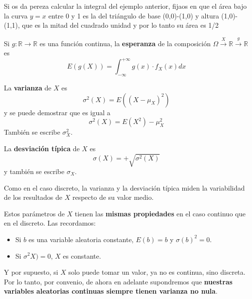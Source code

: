 \documentclass[
  spanish,
  letterpaper,
  DIV=11,
  numbers=noendperiod]{scrreprt}
\begin{document}

Si os da pereza calcular la integral del ejemplo anterior, fijaos en que
el área bajo la curva \(y=x\) entre 0 y 1 es la del triángulo de base
(0,0)-(1,0) y altura (1,0)-(1,1), que es la mitad del cuadrado unidad y
por lo tanto su área es 1/2 

Si \(g:\mathbb{R}\to \mathbb{R}\) es una función continua, la
\textbf{esperanza} de la composición
\(\Omega \stackrel{X}{\longrightarrow} \mathbb{R}\stackrel{g}{\longrightarrow}\mathbb{R}\)
es \[
E(g(X))=\int_{-\infty}^{+\infty} g(x) \cdot f_X(x)dx
\]

La \textbf{varianza} de \(X\) es \[
\sigma^2(X)=E((X-\mu_X)^2)
\] y se puede demostrar que es igual a \[
\sigma^2(X)=E(X^2)-\mu_X^2
\] También se escribe \(\sigma_X^2\).

La \textbf{desviación típica} de \(X\) es \[
\sigma(X)=+\sqrt{\sigma^2(X)}
\] y también se escribe \(\sigma_X\).

Como en el caso discreto, la varianza y la desviación típica miden la
variabilidad de los resultados de \(X\) respecto de su valor medio.

Estos parámetros de \(X\) tienen las \textbf{mismas propiedades} en el
caso continuo que en el discreto. Las recordamos:

\begin{itemize}
\item
  Si \(b\) es una variable aleatoria constante, \(E(b)=b\) y
  \(\sigma(b)^2=0\).
\item
  Si \(\sigma^2X)=0\), \(X\) es constante.
\end{itemize}

\begin{tcolorbox}[enhanced jigsaw, arc=.35mm, bottomrule=.15mm, bottomtitle=1mm, breakable, colback=white, colbacktitle=quarto-callout-note-color!10!white, colframe=quarto-callout-note-color-frame, coltitle=black, left=2mm, leftrule=.75mm, opacityback=0, opacitybacktitle=0.6, rightrule=.15mm, title=\textcolor{quarto-callout-note-color}{\faInfo}\hspace{0.5em}{Nota}, titlerule=0mm, toprule=.15mm, toptitle=1mm]

Y por supuesto, si \(X\) solo puede tomar un valor, ya no es continua,
sino discreta. Por lo tanto, por convenio, de ahora en adelante
supondremos que \textbf{nuestras variables aleatorias continuas siempre
tienen varianza no nula}.

\end{tcolorbox}
\end{document}
